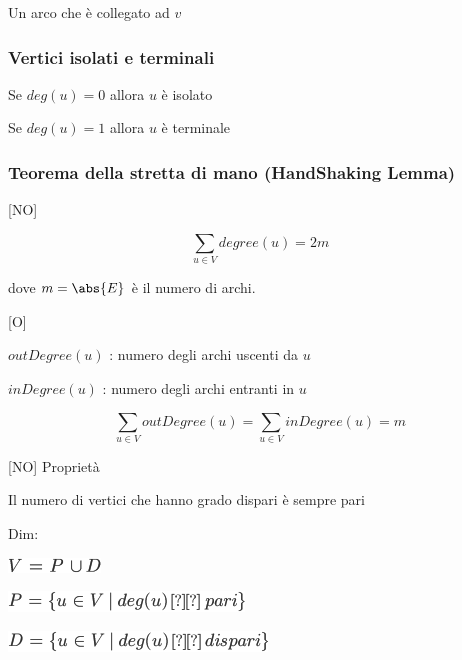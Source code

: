 \documentclass{article}
\begin{document}
{{Un arco che è collegato ad $v$}

\hypertarget{h.vm6z084zc6rf}{\subsubsection{\texorpdfstring{{Vertici isolati e terminali}}{Vertici isolati e terminali}}\label{h.vm6z084zc6rf}}

{Se $deg(u) = 0$ allora $u$ è isolato}

{Se $deg(u) = 1$ allora $u$ è terminale}

\hypertarget{h.d1yeo9bkhutt}{\subsubsection{\texorpdfstring{{Teorema
della stretta di mano (HandShaking
Lemma)}}{Teorema della stretta di mano (HandShaking Lemma)}}\label{h.d1yeo9bkhutt}}

{{[}NO{]}}

\begin{equation}
\sum_{u \in V}{degree(u)} = 2m
\end{equation}

{dove $m = \abs{E}$ è il numero di archi.}

{{[}O{]}}

{$outDegree(u)$ : numero degli archi uscenti da $u$}

{$inDegree(u)$ : numero degli archi entranti in $u$}

\begin{equation}
\sum_{u \in V}{outDegree(u)} = \sum_{u \in V}{inDegree(u)} = m
\end{equation}

{{[}NO{]} Proprietà}

{Il numero di vertici che hanno grado dispari è sempre pari}

{Dim: }

\includegraphics{images/image366.png}

\includegraphics{images/image367.png}

\includegraphics{images/image368.png}

{}

}
\end{document}
